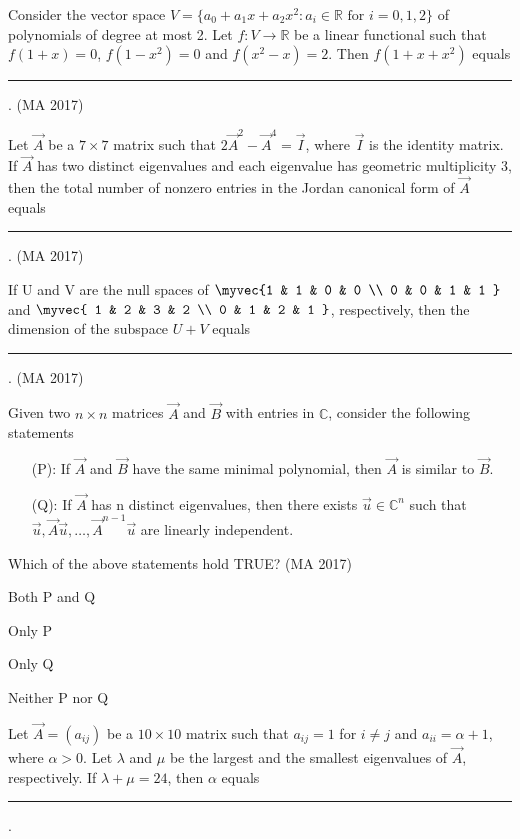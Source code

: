 \item
Consider the vector space $V = \{a_0 + a_1x + a_2x^2 : a_i \in \mathbb{R} \text{ for } i=0,1,2\}$ of polynomials of degree at most 2. Let $f: V \to \mathbb{R}$ be a linear functional such that $f(1+x)=0$, $f(1-x^2)=0$ and $f(x^2-x)=2$. Then $f(1+x+x^2)$ equals \rule{1cm}{0.01pt}.
\hfill (MA 2017)
\item
Let $\vec{A}$ be a $7 \times 7$ matrix such that $2\vec{A}^2 - \vec{A}^4 = \vec{I}$, where $\vec{I}$ is the identity matrix. If $\vec{A}$ has two distinct eigenvalues and each eigenvalue has geometric multiplicity 3, then the total number of nonzero entries in the Jordan canonical form of $\vec{A}$ equals \rule{1.5cm}{0.4pt}.
\hfill (MA 2017)
\item
If U and V are the null spaces of $\myvec {1 & 1 & 0 & 0 \\ 0 & 0 & 1 & 1 }$ and $\myvec{ 1 & 2 & 3 & 2 \\ 0 & 1 & 2 & 1 }$, respectively, then the dimension of the subspace $U+V$ equals \rule{1.5cm}{0.4pt}.
\hfill (MA 2017)
\item
Given two $n \times n$ matrices $\vec{A}$ and $\vec{B}$ with entries in $\mathbb{C}$, consider the following statements
\begin{itemize}
\item[(P):] If $\vec{A}$ and $\vec{B}$ have the same minimal polynomial, then $\vec{A}$ is similar to $\vec{B}$.
\item[(Q):] If $\vec{A}$ has n distinct eigenvalues, then there exists $\vec{u} \in \mathbb{C}^n$ such that $\vec{u}, \vec{A}\vec{u}, \dots, \vec{A}^{n-1}\vec{u}$ are linearly independent.
\end{itemize}
Which of the above statements hold TRUE?
\hfill (MA 2017)
\begin{enumerate}
\begin{multicols}{4}
\item Both P and Q
\item Only P
\item Only Q
\item Neither P nor Q
\end{multicols}
\end{enumerate}
\item
Let $\vec{A}=(a_{ij})$ be a $10 \times 10$ matrix such that $a_{ij}=1$ for $i \ne j$ and $a_{ii}=\alpha+1$, where $\alpha > 0$. Let $\lambda$ and $\mu$ be the largest and the smallest eigenvalues of $\vec{A}$, respectively. If $\lambda + \mu = 24$, then $\alpha$ equals \rule{1.5cm}{0.4pt}.
